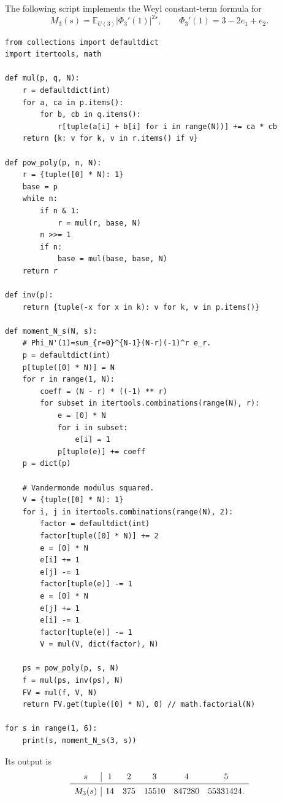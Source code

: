 \documentclass[11pt]{article}
\begin{document}
The following script implements the Weyl constant-term formula for
\[
M_3(s)=\mathbb E_{U(3)}|\Phi_3'(1)|^{2s},
\qquad
\Phi_3'(1)=3-2e_1+e_2.
\]

\begin{verbatim}
from collections import defaultdict
import itertools, math

def mul(p, q, N):
    r = defaultdict(int)
    for a, ca in p.items():
        for b, cb in q.items():
            r[tuple(a[i] + b[i] for i in range(N))] += ca * cb
    return {k: v for k, v in r.items() if v}

def pow_poly(p, n, N):
    r = {tuple([0] * N): 1}
    base = p
    while n:
        if n & 1:
            r = mul(r, base, N)
        n >>= 1
        if n:
            base = mul(base, base, N)
    return r

def inv(p):
    return {tuple(-x for x in k): v for k, v in p.items()}

def moment_N_s(N, s):
    # Phi_N'(1)=sum_{r=0}^{N-1}(N-r)(-1)^r e_r.
    p = defaultdict(int)
    p[tuple([0] * N)] = N
    for r in range(1, N):
        coeff = (N - r) * ((-1) ** r)
        for subset in itertools.combinations(range(N), r):
            e = [0] * N
            for i in subset:
                e[i] = 1
            p[tuple(e)] += coeff
    p = dict(p)

    # Vandermonde modulus squared.
    V = {tuple([0] * N): 1}
    for i, j in itertools.combinations(range(N), 2):
        factor = defaultdict(int)
        factor[tuple([0] * N)] += 2
        e = [0] * N
        e[i] += 1
        e[j] -= 1
        factor[tuple(e)] -= 1
        e = [0] * N
        e[j] += 1
        e[i] -= 1
        factor[tuple(e)] -= 1
        V = mul(V, dict(factor), N)

    ps = pow_poly(p, s, N)
    f = mul(ps, inv(ps), N)
    FV = mul(f, V, N)
    return FV.get(tuple([0] * N), 0) // math.factorial(N)

for s in range(1, 6):
    print(s, moment_N_s(3, s))
\end{verbatim}

Its output is
\[
\begin{array}{c|ccccc}
s&1&2&3&4&5\\\midrule
M_3(s)&14&375&15510&847280&55331424.
\end{array}
\]
\end{document}
